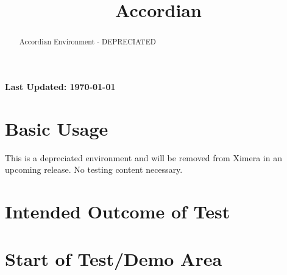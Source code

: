 \documentclass{ximera}
\title{Accordian}
\begin{document}
\begin{abstract}
    Accordian Environment - DEPRECIATED
\end{abstract}
\maketitle

{{\Huge \bfseries Last Updated: \today}} \\


\section{Basic Usage}

This is a depreciated environment and will be removed from Ximera in an upcoming release. No testing content necessary.

\section{Intended Outcome of Test}

\section{Start of Test/Demo Area}


\hrulefill
\end{document}
